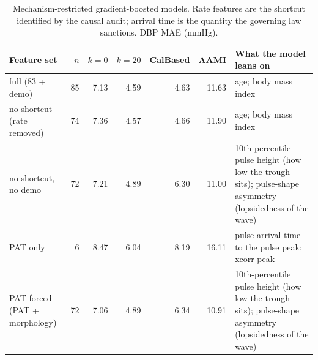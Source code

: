 \begin{table}[t]
\centering
\small
\caption{Mechanism-restricted gradient-boosted models. Rate features are the shortcut identified by the causal audit; arrival time is the quantity the governing law sanctions. DBP MAE (mmHg).}
\label{tab:mechanism}
\begin{tabular}{l r r r r r l}
\toprule
Feature set & $n$ & $k{=}0$ & $k{=}20$ & CalBased & AAMI & What the model leans on \\
\midrule
full (83 + demo) & 85 & 7.13 & 4.59 & 4.63 & 11.63 & age; body mass index \\
no shortcut (rate removed) & 74 & 7.36 & 4.57 & 4.66 & 11.90 & age; body mass index \\
no shortcut, no demo & 72 & 7.21 & 4.89 & 6.30 & 11.00 & 10th-percentile pulse height (how low the trough sits); pulse-shape asymmetry (lopsidedness of the wave) \\
PAT only & 6 & 8.47 & 6.04 & 8.19 & 16.11 & pulse arrival time to the pulse peak; xcorr peak \\
PAT forced (PAT + morphology) & 72 & 7.06 & 4.89 & 6.34 & 10.91 & 10th-percentile pulse height (how low the trough sits); pulse-shape asymmetry (lopsidedness of the wave) \\
\bottomrule
\end{tabular}
\end{table}
